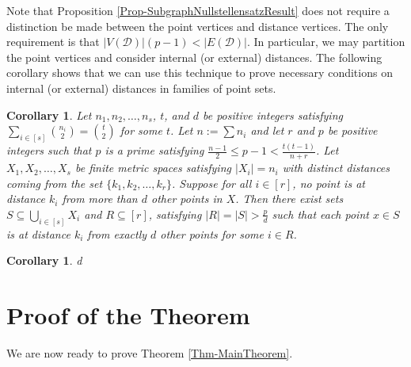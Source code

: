 \documentclass[12pt]{article}
\newtheorem{cor}[thm]{Corollary}
\theoremstyle{definition}
\begin{document}
	Note that Proposition \ref{Prop-SubgraphNullstellensatzResult} does not require a distinction be made between the point vertices and distance vertices.  The only requirement is that $|V(\mathcal{D})|(p-1) < |E(\mathcal{D})|$.  In particular, we may partition the point vertices and consider internal (or external) distances.  The following corollary shows that we can use this technique to prove necessary conditions on internal (or external) distances in families of point sets.
	
	\begin{cor}
		Let $n_1, n_2, \ldots, n_s$, $t$, and $d$ be positive integers satisfying $\sum_{i \in [s]}{n_i \choose 2} = {t \choose 2}$ for some $t$. Let $n := \sum n_i$ and let $r$ and $p$ be positive integers such that $p$ is a prime satisfying $\tfrac{n-1}{2} \leq p-1 < \tfrac{t(t-1)}{n+r}$.  Let $X_1, X_2, \ldots, X_s$ be finite metric spaces satisfying $|X_i| = n_i$ with distinct distances coming from the set $\{k_1, k_2, \ldots, k_r\}$.  Suppose for all $i \in [r]$, no point is at distance $k_i$ from more than $d$ other points in $X$.  Then there exist sets $S \subseteq \bigcup_{i \in [s]}X_i$ and $R \subseteq [r]$, satisfying $|R| = |S| > \tfrac{p}{d}$ such that each point $x \in S$ is at distance $k_i$ from exactly $d$ other points for some $i \in R$.
	\end{cor}
	
	\begin{cor}
		d
	\end{cor}
	
	\section{Proof of the Theorem}
	
	We are now ready to prove Theorem \ref{Thm-MainTheorem}.
	
\end{document}
